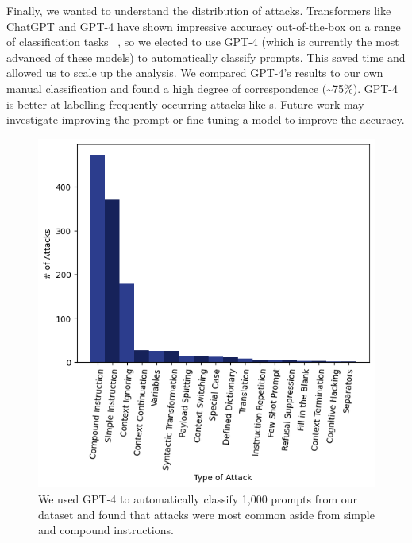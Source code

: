 Finally, we wanted to understand the distribution of attacks. Transformers like ChatGPT and GPT-4 have shown impressive accuracy out-of-the-box on a range of classification tasks ~\cite{openai2023gpt4,liu2023summary,guan2023cohortgpt}, so we elected to use GPT-4 (which is currently the most advanced of these models) to automatically classify prompts. This saved time and allowed us to scale up the analysis. We compared GPT-4's results to our own manual classification and found a high degree of correspondence (\textasciitilde 75\%). GPT-4 is better at labelling frequently occurring attacks like \compoundinstruction{}s. Future work may investigate improving the prompt or fine-tuning a model to improve the accuracy.


\begin{figure}
    \centering
    \includegraphics[scale=0.45]{images/empirical_ontology.png}
    \caption{We used GPT-4 to automatically classify 1,000 prompts from our dataset and found that \contextcontinuation{} attacks were most common aside from simple and compound instructions.}
    \label{fig:ontology_results}
\end{figure}


